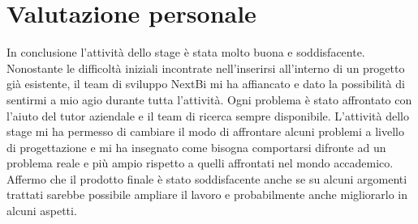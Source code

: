 \section{Valutazione personale}

In conclusione l'attività dello stage è stata molto buona e soddisfacente. Nonostante le diffi coltà iniziali incontrate nell’inserirsi all’interno di un progetto già esistente, il team di sviluppo NextBi mi ha affiancato e dato la possibilità di sentirmi a mio agio durante tutta l'attività. Ogni problema è stato affrontato con l'aiuto del tutor aziendale e il team di ricerca sempre disponibile.
L'attività dello stage mi ha permesso di cambiare il modo di affrontare alcuni problemi a livello di progettazione e mi ha insegnato come bisogna comportarsi difronte ad un problema reale e più ampio rispetto a quelli affrontati nel mondo accademico. Affermo che il prodotto finale è stato soddisfacente anche se su alcuni argomenti trattati sarebbe possibile ampliare il lavoro e probabilmente anche migliorarlo in alcuni aspetti.







 